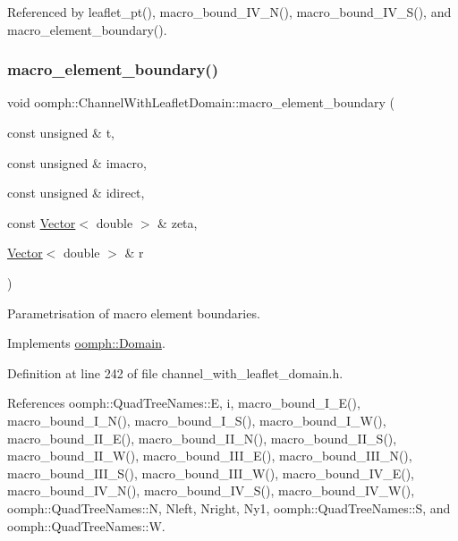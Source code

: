 Referenced by leaflet\+\_\+pt(), macro\+\_\+bound\+\_\+\+I\+V\+\_\+\+N(), macro\+\_\+bound\+\_\+\+I\+V\+\_\+\+S(), and macro\+\_\+element\+\_\+boundary().

\mbox{\label{classoomph_1_1ChannelWithLeafletDomain_ae4b123847f4ab6e242a0409d72fe5cbd}} 
\subsubsection{\texorpdfstring{macro\+\_\+element\+\_\+boundary()}{macro\_element\_boundary()}}
{\footnotesize\ttfamily void oomph\+::\+Channel\+With\+Leaflet\+Domain\+::macro\+\_\+element\+\_\+boundary (\begin{DoxyParamCaption}\item[{const unsigned \&}]{t,  }\item[{const unsigned \&}]{imacro,  }\item[{const unsigned \&}]{idirect,  }\item[{const \hyperlink{classoomph_1_1Vector}{Vector}$<$ double $>$ \&}]{zeta,  }\item[{\hyperlink{classoomph_1_1Vector}{Vector}$<$ double $>$ \&}]{r }\end{DoxyParamCaption})\hspace{0.3cm}{\ttfamily [virtual]}}



Parametrisation of macro element boundaries. 



Implements \hyperlink{classoomph_1_1Domain_a95f3e00d28ea37e6c4d3027bfac91096}{oomph\+::\+Domain}.



Definition at line 242 of file channel\+\_\+with\+\_\+leaflet\+\_\+domain.\+h.



References oomph\+::\+Quad\+Tree\+Names\+::E, i, macro\+\_\+bound\+\_\+\+I\+\_\+\+E(), macro\+\_\+bound\+\_\+\+I\+\_\+\+N(), macro\+\_\+bound\+\_\+\+I\+\_\+\+S(), macro\+\_\+bound\+\_\+\+I\+\_\+\+W(), macro\+\_\+bound\+\_\+\+I\+I\+\_\+\+E(), macro\+\_\+bound\+\_\+\+I\+I\+\_\+\+N(), macro\+\_\+bound\+\_\+\+I\+I\+\_\+\+S(), macro\+\_\+bound\+\_\+\+I\+I\+\_\+\+W(), macro\+\_\+bound\+\_\+\+I\+I\+I\+\_\+\+E(), macro\+\_\+bound\+\_\+\+I\+I\+I\+\_\+\+N(), macro\+\_\+bound\+\_\+\+I\+I\+I\+\_\+\+S(), macro\+\_\+bound\+\_\+\+I\+I\+I\+\_\+\+W(), macro\+\_\+bound\+\_\+\+I\+V\+\_\+\+E(), macro\+\_\+bound\+\_\+\+I\+V\+\_\+\+N(), macro\+\_\+bound\+\_\+\+I\+V\+\_\+\+S(), macro\+\_\+bound\+\_\+\+I\+V\+\_\+\+W(), oomph\+::\+Quad\+Tree\+Names\+::N, Nleft, Nright, Ny1, oomph\+::\+Quad\+Tree\+Names\+::S, and oomph\+::\+Quad\+Tree\+Names\+::W.



